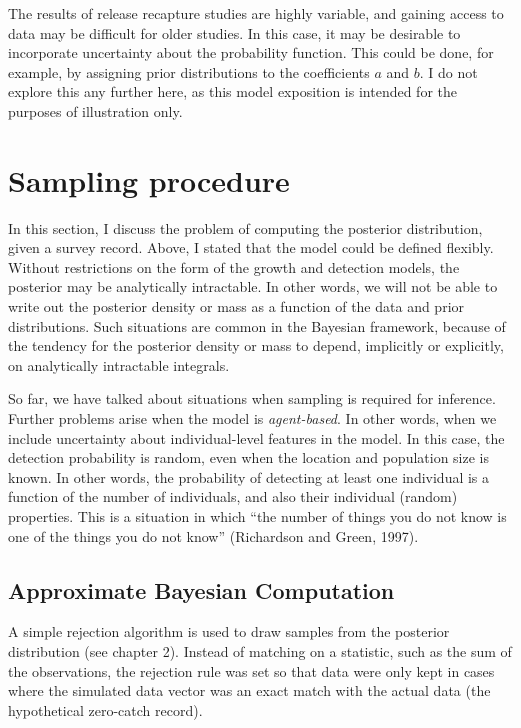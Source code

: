 \documentclass[
  oneside]{book}
\begin{document}
The results of release recapture studies are highly variable, and gaining access to data may be difficult for older studies. In this case, it may be desirable to incorporate uncertainty about the probability function. This could be done, for example, by assigning prior distributions to the coefficients \(a\) and \(b\). I do not explore this any further here, as this model exposition is intended for the purposes of illustration only.

\hypertarget{sampling-procedure}{%
\section{Sampling procedure}\label{sampling-procedure}}

In this section, I discuss the problem of computing the posterior distribution, given a survey record. Above, I stated that the model could be defined flexibly. Without restrictions on the form of the growth and detection models, the posterior may be analytically intractable. In other words, we will not be able to write out the posterior density or mass as a function of the data and prior distributions. Such situations are common in the Bayesian framework, because of the tendency for the posterior density or mass to depend, implicitly or explicitly, on analytically intractable integrals.

So far, we have talked about situations when sampling is required for inference. Further problems arise when the model is \emph{agent-based}. In other words, when we include uncertainty about individual-level features in the model. In this case, the detection probability is random, even when the location and population size is known. In other words, the probability of detecting at least one individual is a function of the number of individuals, and also their individual (random) properties. This is a situation in which ``the number of things you do not know is one of the things you do not know'' (Richardson and Green, 1997).

\hypertarget{approximate-bayesian-computation}{%
\subsection{Approximate Bayesian Computation}\label{approximate-bayesian-computation}}

A simple rejection algorithm is used to draw samples from the posterior distribution (see chapter 2). Instead of matching on a statistic, such as the sum of the observations, the rejection rule was set so that data were only kept in cases where the simulated data vector was an exact match with the actual data (the hypothetical zero-catch record).
\end{document}
